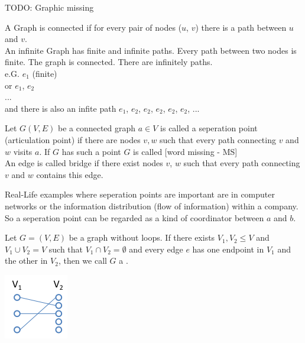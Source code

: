 \begin{example*}
TODO: Graphic missing\\
\end{example*}

A Graph is connected if for every pair of nodes ($u$, $v$) there is a path between $u$ and $v$.\\

An infinite Graph has finite and infinite paths. Every path between two nodes is finite. The graph is connected. There are infinitely paths.\\
e.G. $e{_1}$ (finite)\\
or $e{_1}$, $e{_2}$\\
...\\
and there is also an infite path $e{_1}$, $e{_2}$, $e{_2}$, $e{_2}$, $e{_2}$, $e{_2}$, ...\\


\begin{definition}
    Let $G(V,E)$ be a connected graph $a \in V$ is called a seperation point (articulation point) if there are nodes $v, w$ such that every path connecting $v$ and $w$ visits $a$. If $G$ has such a point $G$ is called [word missing - MS]\\
    An edge is called bridge if there exist nodes $v$, $w$ such that every path connecting $v$ and $w$ contains this edge.
\end{definition}

\begin{example*}
Real-Life examples where seperation points are important are in computer networks or the information distribution (flow of information) within a company. So a seperation point can be regarded as a kind of coordinator between $a$ and $b$.
\end{example*}

\begin{definition}
    Let $G = (V,E)$ be a graph without loops. If there exists $V_{1}, V_{2} \leq V$ and $V_{1} \cup V_{2} = V$
    such that $V_{1} \cap V_{2} = \emptyset$ and every edge $e$ has one endpoint in $V{_1}$ and the other in $V_{2}$,
    then we call $G$ a .
\end{definition}

\begin{example*}
    \includegraphics{diagrams/def14_example1.png}
\end{example*}

